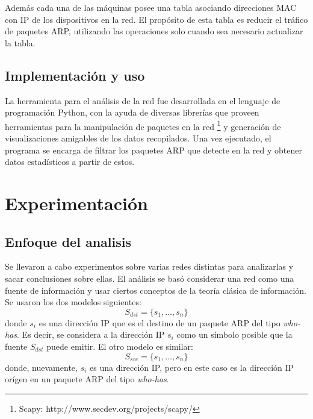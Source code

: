 Además cada una de las máquinas posee una tabla asociando direcciones MAC con IP de los dispositivos en la red. El propósito de esta tabla es reducir el tráfico de paquetes ARP, utilizando las operaciones solo cuando sea necesario actualizar la tabla.

\subsection{Implementación y uso}
La herramienta para el análisis de la red fue desarrollada en el lenguaje de programación Python, con la ayuda de diversas librerías que proveen herramientas para la manipulación de paquetes en la red \footnote{Scapy: http://www.secdev.org/projects/scapy/} y generación de visualizaciones amigables de los datos recopilados. Una vez ejecutado, el programa se encarga de filtrar los paquetes ARP que detecte en la red y obtener datos estadísticos a partir de estos. 

\section{Experimentación}
\subsection{Enfoque del analisis}
    Se llevaron a cabo experimentos sobre varias redes distintas para analizarlas y sacar conclusiones sobre ellas. El análisis se basó considerar una red como una fuente de información y usar ciertos conceptos de la teoría clásica de información. Se usaron los dos modelos siguientes:
    $$ S_{dst} = \{s_1, \dots, s_n \} $$
    donde $s_i$ es una dirección IP que es el destino de un paquete ARP del tipo \textit{who-has}. Es decir, se considera a la dirección IP $s_i$ como un símbolo posible que la fuente $S_{dst}$ puede emitir. El otro modelo es similar:
    $$ S_{src} = \{s_1, \dots, s_n \} $$
    donde, nuevamente, $s_i$ es una dirección IP, pero en este caso es la dirección IP orígen en un paquete ARP del tipo \textit{who-has}.


